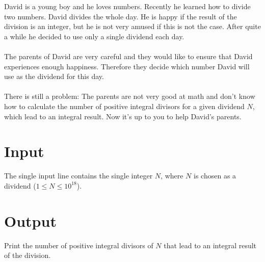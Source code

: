 
David is a young boy and he loves numbers. Recently he learned how to divide two numbers.
David divides the whole day.
He is happy if the result of the division is an integer,
but he is not very amused if this is not the case.
After quite a while he decided to use only a single dividend each day.
\\
\\
The parents of David are very careful and they would like to ensure that
David experiences enough happiness.
Therefore they decide which number David will use as the dividend for this day.
\\
\\
There is still a problem: The parents are not very good at math and don't know how to calculate
the number of positive integral divisors for a given dividend $N$, which lead to an integral result.
Now it's up to you to help David's parents.

\section*{Input}
The single input line contains the single integer $N$, where $N$ is chosen as a dividend ($1\le N\le 10^{18}$).

\section*{Output}
Print the number of positive integral divisors of $N$ that lead to an integral
result of the division.
